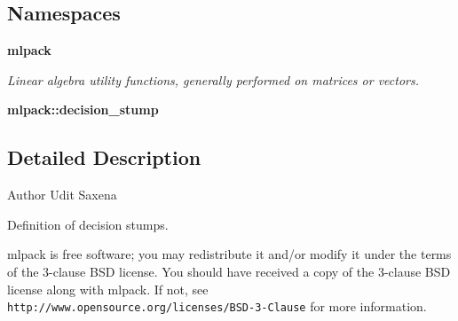 \subsection*{Namespaces}
\begin{DoxyCompactItemize}
\item 
 {\bf mlpack}
\begin{DoxyCompactList}\small\item\em Linear algebra utility functions, generally performed on matrices or vectors. \end{DoxyCompactList}\item 
 {\bf mlpack\+::decision\+\_\+stump}
\end{DoxyCompactItemize}


\subsection{Detailed Description}
\begin{DoxyAuthor}{Author}
Udit Saxena
\end{DoxyAuthor}
Definition of decision stumps.

mlpack is free software; you may redistribute it and/or modify it under the terms of the 3-\/clause B\+SD license. You should have received a copy of the 3-\/clause B\+SD license along with mlpack. If not, see {\tt http\+://www.\+opensource.\+org/licenses/\+B\+S\+D-\/3-\/\+Clause} for more information. 
